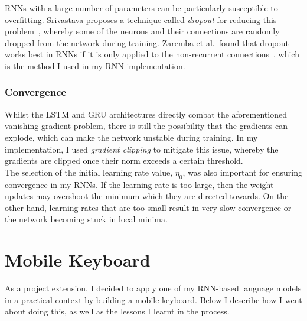 \documentclass[a4paper, 12pt]{report}
\newcommand{\tit}[1]{\textit{#1}}
\begin{document}
RNNs with a large number of parameters can be particularly susceptible to overfitting. Srivastava proposes a technique called \tit{dropout} for reducing this problem~\cite{dropout:srivastava2013}, whereby some of the neurons and their connections are randomly dropped from the network during training. Zaremba et al.\ found that dropout works best in RNNs if it is only applied to the non-recurrent connections~\cite{dropout_rnns:zaremba2014}, which is the method I used in my RNN implementation.

\subsubsection{Convergence}
Whilst the LSTM and GRU architectures directly combat the aforementioned vanishing gradient problem, there is still the possibility that the gradients can explode, which can make the network unstable during training. In my implementation, I used \tit{gradient clipping} to mitigate this issue, whereby the gradients are clipped once their norm exceeds a certain threshold. \\

The selection of the initial learning rate value, $\eta_0$, was also important for ensuring convergence in my RNNs. If the learning rate is too large, then the weight updates may overshoot the minimum which they are directed towards. On the other hand, learning rates that are too small result in very slow convergence or the network becoming stuck in local minima.

\section{Mobile Keyboard} \label{mobile_keyboard}

As a project extension, I decided to apply one of my RNN-based language models in a practical context by building a mobile keyboard. Below I describe how I went about doing this, as well as the lessons I learnt in the process. \\
\end{document}
